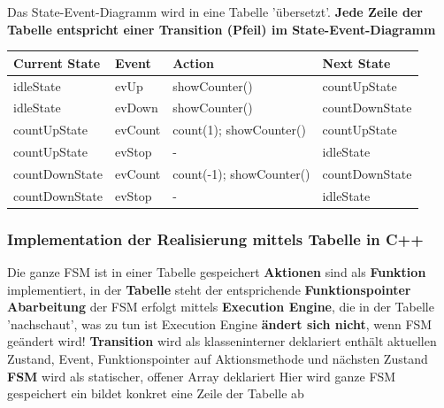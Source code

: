 Das State-Event-Diagramm wird in eine Tabelle 'übersetzt'. \textbf{Jede Zeile der Tabelle entspricht einer Transition (Pfeil) im 
State-Event-Diagramm}

\begin{center}
    \begin{tabular}{llll}
        \toprule
        \textbf{Current State}                  & \textbf{Event}        & \textbf{Action}                   & \textbf{Next State}       \\
        \midrule
        \rowcolor{gray!40} idleState            & evUp                  & showCounter()                     & countUpState              \\
        idleState                               & evDown                & showCounter()                     & countDownState            \\
        \rowcolor{gray!40} countUpState         & evCount               & count(1); showCounter()           & countUpState              \\
        countUpState                            & evStop                & -                                 & idleState                 \\
        \rowcolor{gray!40} countDownState       & evCount               & count(-1); showCounter()          & countDownState            \\
        countDownState                          & evStop                & -                                 & idleState                 \\
        \bottomrule
    \end{tabular}
\end{center}

\columnbreak

\subsubsection{Implementation der Realisierung mittels Tabelle in C++}

\begin{outline}
    \1 Die ganze FSM ist in einer Tabelle gespeichert
    \1 \textbf{Aktionen} sind als \textbf{Funktion} implementiert, in der \textbf{Tabelle} steht der entsprichende \textbf{Funktionspointer} %
    \1 \textbf{Abarbeitung} der FSM erfolgt mittels \textbf{Execution Engine}, die in der Tabelle 'nachschaut', was zu tun ist
        \2 Execution Engine \textbf{ändert sich nicht}, wenn FSM geändert wird!
    \1 \textbf{Transition} wird als klasseninterner  deklariert
        \2 enthält aktuellen Zustand, Event, Funktionspointer auf Aktionsmethode und nächsten Zustand
    \1 \textbf{FSM} wird als statischer, offener Array deklariert
        \2 Hier wird ganze FSM gespeichert
        \2 ein  bildet konkret eine Zeile der Tabelle ab
\end{outline}


